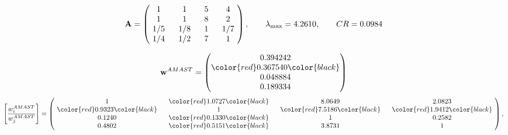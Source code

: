 \begin{example}
\begin{equation*}
\mathbf{A} =
\begin{pmatrix}
$\,\,$ 1 $\,\,$ & $\,\,$1$\,\,$ & $\,\,$5$\,\,$ & $\,\,$4 $\,\,$ \\
$\,\,$ 1 $\,\,$ & $\,\,$ 1 $\,\,$ & $\,\,$8$\,\,$ & $\,\,$2 $\,\,$ \\
$\,\,$ 1/5$\,\,$ & $\,\,$ 1/8$\,\,$ & $\,\,$ 1 $\,\,$ & $\,\,$ 1/7 $\,\,$ \\
$\,\,$ 1/4$\,\,$ & $\,\,$ 1/2$\,\,$ & $\,\,$7$\,\,$ & $\,\,$ 1  $\,\,$ \\
\end{pmatrix},
\qquad
\lambda_{\max} =
4.2610,
\qquad
CR = 0.0984
\end{equation*}

\begin{equation*}
\mathbf{w}^{AMAST} =
\begin{pmatrix}
0.394242\\
\color{red} 0.367540\color{black} \\
0.048884\\
0.189334
\end{pmatrix}\end{equation*}
\begin{equation*}
\left[ \frac{{w}^{AMAST}_i}{{w}^{AMAST}_j} \right] =
\begin{pmatrix}
$\,\,$ 1 $\,\,$ & $\,\,$\color{red} 1.0727\color{black} $\,\,$ & $\,\,$8.0649$\,\,$ & $\,\,$2.0823$\,\,$ \\
$\,\,$\color{red} 0.9323\color{black} $\,\,$ & $\,\,$ 1 $\,\,$ & $\,\,$\color{red} 7.5186\color{black} $\,\,$ & $\,\,$\color{red} 1.9412\color{black}   $\,\,$ \\
$\,\,$0.1240$\,\,$ & $\,\,$\color{red} 0.1330\color{black} $\,\,$ & $\,\,$ 1 $\,\,$ & $\,\,$0.2582 $\,\,$ \\
$\,\,$0.4802$\,\,$ & $\,\,$\color{red} 0.5151\color{black} $\,\,$ & $\,\,$3.8731$\,\,$ & $\,\,$ 1  $\,\,$ \\
\end{pmatrix},
\end{equation*}


\end{example}
